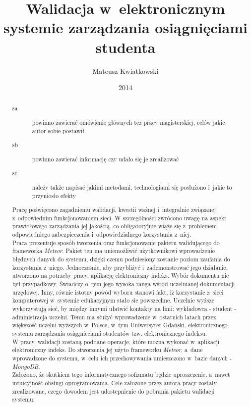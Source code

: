 \documentclass[brudnopis]{xmgr}
\author   {Mateusz Kwiatkowski}
\title    {Walidacja w~elektronicznym systemie zarządzania osiągnięciami studenta}
\date     {2014}
\begin{document}
\begin{abstract}

\begin{description}
\item[sa] \textcolor{sa}{powinno zawierać omówienie głównych
tez pracy magisterskiej, celów jakie autor sobie postawił}
\item[sb] \textcolor{sb}{powinno zawierać informację czy udało
  się je zrealizować}
\item[sc] \textcolor{sc}{należy także napisać jakimi metodami,
  technologiami się posłużono i~jakie to przyniosło efekty}
\end{description}

\indent \indent \textcolor{sa}{Pracę poświęcono zagadnieniu walidacji, kwestii ważnej i~integralnie związanej z~odpowiednim funkcjonowaniem sieci.
W szczególności zwrócono uwagę na aspekt prawidłowego zarządzania jej jakością, co obligatoryjnie wiąże się z~problemem
odpowiedniego zabezpieczenia i~odpowiedzialnego korzystania z~niej.}
\\
\indent \textcolor{sa}{Praca prezentuje sposób tworzenia oraz funkcjonowanie pakietu walidującego do frameworka \textit{Meteor}. Pakiet ten
ma uniemożliwić użytkownikowi wprowadzenie błędnych danych do systemu, dzięki czemu podniesiony zostanie poziom zaufania
do korzystania z~niego. Jednocześnie, aby przybliżyć i~zademonstrować jego działanie, utworzono na potrzeby pracy, aplikację elektroniczny indeks.
Wybór dokumentu nie był przypadkowy. Świadczy o~tym jego wysoka ranga wśród uczelnianej dokumentacji urzędowej. Inny, równie istotny powód
wyboru stanowi fakt, iż korzystanie z~sieci komputerowej w~systemie edukacyjnym stało sie powszechne. Uczelnie wyższe wykorzystują sieć, by
między innymi ułatwić kontakty na linii: wykładowca - student - administracja uczelni.  Temu ma służyć wprowadzenie w~ostatnich latach przez
większość uczelni wyższych w~Polsce, w~tym Uniwersytet Gdański, elektronicznego systemu zarządzania osiągnieciami studentów
tzw. elektronicznego indeksu.}
\\
\indent \textcolor{sc}{W pracy, walidacji zostaną poddane operacje, które można wykonać w~aplikacji elektroniczny indeks. Do stworzenia jej użyto frameworku \textit{Meteor}, a~dane wprowadzone do systemu, w~celu ich przechowywania umieszczono w~bazie danych - \textit{MongoDB}.}
\\
\indent \textcolor{sb}{Założono, że skutkiem tego informatycznego sofizmatu będzie uproszczenie, a~nawet intuicyjność obsługi oprogramowania. Cele założone przez autora pracy zostały zrealizowane, czego dowodem jest udostepnienie do pobrania pakietu walidacji systemu.}

\end{abstract}
\end{document}
